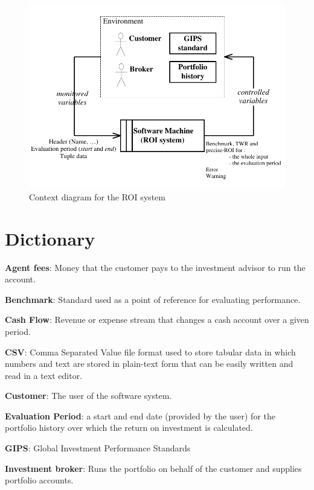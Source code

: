 \documentclass[runningheads,12pt]{article}
\begin{document}
\begin{figure}
\centering
\includegraphics[scale=1.0]{inputs/context.pdf}
\caption{Context diagram for the ROI system}
\label{fig:ROI-context}
\end{figure}
\section{Dictionary}

\smallskip


\noindent\textbf{Agent fees}: Money that the customer pays to the investment advisor to run the account.\smallskip

\noindent\textbf{Benchmark}: Standard used as a point of reference for evaluating performance.\smallskip

\noindent\textbf{Cash Flow}: Revenue or expense stream that changes a cash account over a given period.\smallskip

\noindent\textbf{CSV}: Comma Separated Value file format used to store tabular data in which numbers and text are stored in plain-text form that can be easily written and read in a text editor.\smallskip

\noindent\textbf{Customer}: The user of the software system.\smallskip

\noindent\textbf{Evaluation Period}: a start and end date (provided by the user) for the portfolio history over which the return on investment is calculated.\smallskip

\noindent\textbf{GIPS}: Global Investment Performance Standards\smallskip

\noindent\textbf{Investment broker}: Runs the portfolio on behalf of the customer and supplies portfolio accounts.\smallskip
\end{document}
